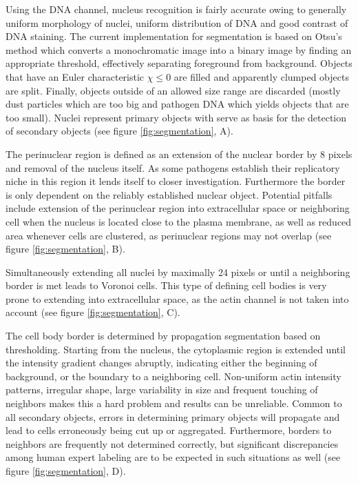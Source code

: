 \begin{description}[leftmargin=0.5cm]
\item[Nuclei:] Using the DNA channel, nucleus recognition is fairly accurate owing to generally uniform morphology of nuclei, uniform distribution of DNA and good contrast of DNA staining. The current implementation for segmentation is based on Otsu's method which converts a monochromatic image into a binary image by finding an appropriate threshold, effectively separating foreground from background. Objects that have an Euler characteristic $\chi \le 0$ are filled and apparently clumped objects are split. Finally, objects outside of an allowed size range are discarded (mostly dust particles which are too big and pathogen DNA which yields objects that are too small). Nuclei represent primary objects with serve as basis for the detection of secondary objects (see figure \ref{fig:segmentation}, A).
\item[PeriNuclei:] The perinuclear region is defined as an extension of the nuclear border by 8 pixels and removal of the nucleus itself. As some pathogens establish their replicatory niche in this region it lends itself to closer investigation. Furthermore the border is only dependent on the reliably established nuclear object. Potential pitfalls include extension of the perinuclear region into extracellular space or neighboring cell when the nucleus is located close to the plasma membrane, as well as reduced area whenever cells are clustered, as perinuclear regions may not overlap (see figure \ref{fig:segmentation}, B).
\item[VoronoiCells:] Simultaneously extending all nuclei by maximally 24 pixels or until a neighboring border is met leads to Voronoi cells. This type of defining cell bodies is very prone to extending into extracellular space, as the actin channel is not taken into account (see figure \ref{fig:segmentation}, C).
\item[Cells:] The cell body border is determined by propagation segmentation based on thresholding. Starting from the nucleus, the cytoplasmic region is extended until the intensity gradient changes abruptly, indicating either the beginning of background, or the boundary to a neighboring cell. Non-uniform actin intensity patterns, irregular shape, large variability in size and frequent touching of neighbors makes this a hard problem and results can be unreliable. Common to all secondary objects, errors in determining primary objects will propagate and lead to cells erroneously being cut up or aggregated. Furthermore, borders to neighbors are frequently not determined correctly, but significant discrepancies among human expert labeling are to be expected in such situations as well (see figure \ref{fig:segmentation}, D).

\end{description}
